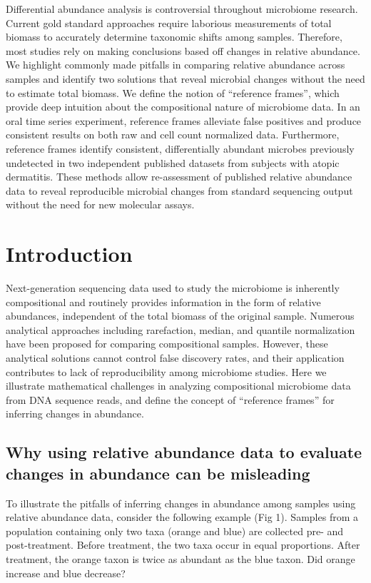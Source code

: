 Differential abundance analysis is controversial throughout microbiome research. Current gold standard
approaches require laborious measurements of total biomass to accurately determine taxonomic shifts
among samples. Therefore, most studies rely on making conclusions based off changes in relative abundance.
We highlight commonly made pitfalls in comparing relative abundance across samples and identify two solutions that
reveal microbial changes without the need to estimate total biomass. We define the notion of ``reference frames'',
which provide deep intuition about the compositional nature of microbiome data. In an oral time series experiment,
reference frames alleviate false positives and produce consistent results on both raw and cell count
normalized data. Furthermore, reference frames identify consistent, differentially abundant
microbes previously undetected in two independent published datasets from subjects with atopic dermatitis.
These methods allow re-assessment of published relative abundance data to reveal reproducible microbial changes
from standard sequencing output without the need for new molecular assays.

\section*{Introduction}
Next-generation sequencing data used to study the microbiome is inherently compositional and routinely provides information in the form of relative abundances, independent of the total biomass of the original sample. Numerous analytical approaches including rarefaction\cite{Weiss2015-gn}, median\cite{Love2014-sn}, and quantile normalization\cite{Love2014-sn,Paulson2013-mm} have been proposed for comparing compositional samples. However, these analytical solutions cannot control false discovery rates\cite{Russel2018-na, Hawinkel2017-ax}, and their application contributes to lack of reproducibility among microbiome studies\cite{Gloor2015-zq}. Here we illustrate mathematical challenges in analyzing compositional microbiome data from DNA sequence reads, and define the concept of “reference frames” for inferring changes in abundance.

\subsection{Why using relative abundance data to evaluate changes in abundance can be misleading}
To illustrate the pitfalls of inferring changes in abundance among samples using relative abundance data, consider the following example (Fig 1). Samples from a population containing only two taxa (orange and blue) are collected pre- and post-treatment. Before treatment, the two taxa occur in equal proportions. After treatment, the orange taxon is twice as abundant as the blue taxon. Did orange increase and blue decrease?

